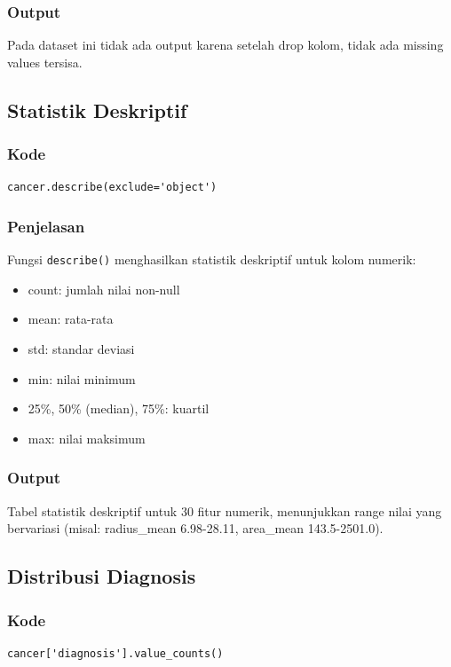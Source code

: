 \documentclass[12pt,a4paper]{article}
\begin{document}
\subsubsection{Output}
Pada dataset ini tidak ada output karena setelah drop kolom, tidak ada missing values tersisa.

\subsection{Statistik Deskriptif}

\subsubsection{Kode}
\begin{lstlisting}[style=pythonstyle]
cancer.describe(exclude='object')
\end{lstlisting}

\subsubsection{Penjelasan}
Fungsi \texttt{describe()} menghasilkan statistik deskriptif untuk kolom numerik:
\begin{itemize}
    \item count: jumlah nilai non-null
    \item mean: rata-rata
    \item std: standar deviasi
    \item min: nilai minimum
    \item 25\%, 50\% (median), 75\%: kuartil
    \item max: nilai maksimum
\end{itemize}

\subsubsection{Output}
Tabel statistik deskriptif untuk 30 fitur numerik, menunjukkan range nilai yang bervariasi (misal: radius\_mean 6.98-28.11, area\_mean 143.5-2501.0).

\subsection{Distribusi Diagnosis}

\subsubsection{Kode}
\begin{lstlisting}[style=pythonstyle]
cancer['diagnosis'].value_counts()
\end{lstlisting}
\end{document}
